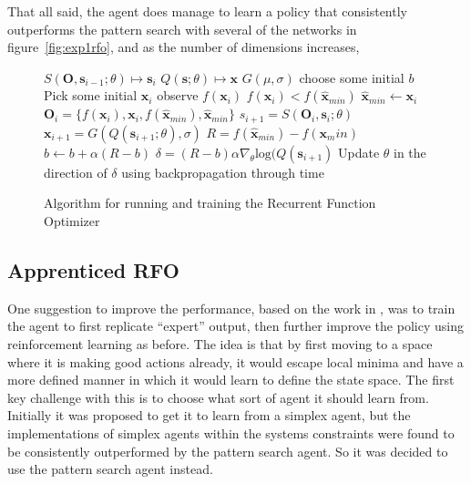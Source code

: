 That all said, the agent does manage to learn a policy that consistently outperforms the pattern search with several of the networks in figure~\ref{fig:exp1rfo}, and as the number of dimensions increases, %

\begin{figure}
\centering
\begin{minipage}{.8\textwidth}
\begin{algorithmic}
\State $S(\boldsymbol{O}, \boldsymbol{s}_{i-1}; \theta) \mapsto \boldsymbol{s}_i$
\State $Q(\boldsymbol{s} ;\theta) \mapsto \boldsymbol{x} $
\State $G(\mu,\sigma)$  
\State choose some initial $b$ 
 \Repeat
 	\State Pick some initial $\boldsymbol{x}_i$
 	\Repeat
 		\State observe $f(\boldsymbol{x}_i)$
 		\If $f(\boldsymbol{x}_i) < f(\hat{\boldsymbol{x}}_{min})$
 			\State$ \hat{\boldsymbol{x}}_{min} \gets \boldsymbol{x}_i$
 		\EndIf
 		\State $\boldsymbol{O}_i = \{f(\boldsymbol{x}_i),\boldsymbol{x}_i, f(\hat{\boldsymbol{x}}_{min}), \hat{\boldsymbol{x}}_{min}\} $
 		\State $s_{i+1} = S(\boldsymbol{O}_i, \boldsymbol{s}_{i}; \theta)$
 		\State $\boldsymbol{x}_{i+1} = G(Q(\boldsymbol{s}_{i+1};\theta),\sigma)$ 
	\State $R = f(\hat{\boldsymbol{x}}_{min}) - f(\boldsymbol{x}_min)$
	\State $b \gets b  + \alpha (R - b)$ 
	\State $\delta = (R - b) \alpha \nabla_\theta \text{log}(Q(\boldsymbol{s}_{i+1})$
	\State Update $\theta$ in the direction of $\delta$ using backpropagation through time
 \end{algorithmic}
 \end{minipage}
 \caption{Algorithm for running and training the Recurrent Function Optimizer}
 \label{alg:rfo}
\end{figure}

\subsection{Apprenticed RFO}



One suggestion to improve the performance, based on the work in \cite{alphaGo}, was to train the agent to first replicate ``expert'' output, then further improve the policy using reinforcement learning as before. The idea is that by first moving to a space where it is making good actions already, it would escape local minima and have a more defined manner in which it would learn to define the state space. The first key challenge with this is to choose what sort of agent it should learn from. Initially it was proposed to get it to learn from a simplex agent, but the implementations of simplex agents within the systems constraints were found to be consistently outperformed by the pattern search agent. So it was decided to use the pattern search agent instead.

